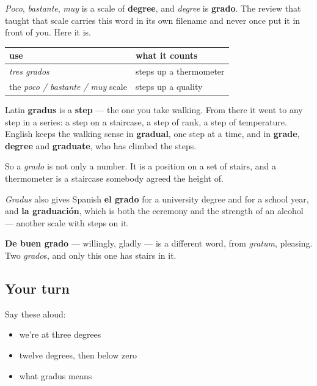\begin{grammarlens}[title={Grammar Lens: the word you already had under another job}]
\emph{Poco}, \emph{bastante}, \emph{muy} is a scale of \textbf{degree}, and \emph{degree} is \textbf{grado}. The review that taught that scale carries this word in its own filename and never once put it in front of you. Here it is.

\noindent
\begin{tabularx}{\linewidth}{@{}>{\raggedright\arraybackslash}X>{\raggedright\arraybackslash}X@{}}
\toprule
\textbf{use} & \textbf{what it counts} \\
\midrule
\emph{tres grados} & steps up a thermometer \\
the \emph{poco / bastante / muy} scale & steps up a quality \\
\bottomrule
\end{tabularx}

Latin \textbf{gradus} is a \textbf{step} — the one you take walking. From there it went to any step in a series: a step on a staircase, a step of rank, a step of temperature. English keeps the walking sense in \textbf{gradual}, one step at a time, and in \textbf{grade}, \textbf{degree} and \textbf{graduate}, who has climbed the steps.

So a \emph{grado} is not only a number. It is a position on a set of stairs, and a thermometer is a staircase somebody agreed the height of.
\end{grammarlens}

\begin{cousinweb}
\emph{Gradus} also gives Spanish \textbf{el grado} for a university degree and for a school year, and \textbf{la graduación}, which is both the ceremony and the strength of an alcohol — another scale with steps on it.

\textbf{De buen grado} — willingly, gladly — is a different word, from \emph{gratum}, pleasing. Two \emph{grado}s, and only this one has stairs in it.
\end{cousinweb}

\subsection*{Your turn}
Say these aloud:

\begin{itemize}
\raggedright
  \item we're at three degrees
  \item twelve degrees, then below zero
  \item what gradus means
\end{itemize}

